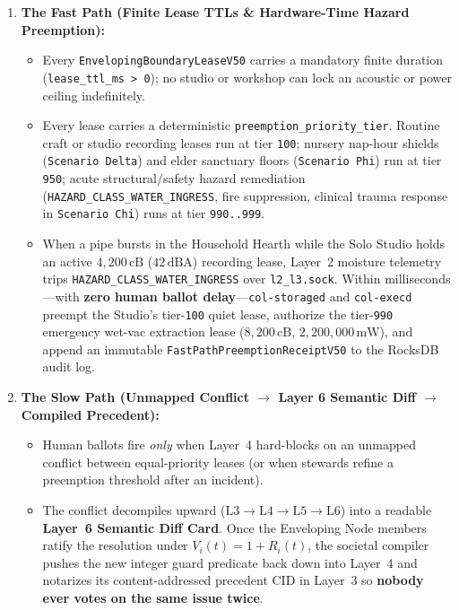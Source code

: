 \begin{enumerate}
    \item \textbf{The Fast Path (Finite Lease TTLs \& Hardware-Time Hazard Preemption):}
    \begin{itemize}
        \item Every \texttt{EnvelopingBoundaryLeaseV50} carries a mandatory finite duration (\texttt{lease\_ttl\_ms > 0}); no studio or workshop can lock an acoustic or power ceiling indefinitely.
        \item Every lease carries a deterministic \texttt{preemption\_priority\_tier}. Routine craft or studio recording leases run at tier \texttt{100}; nursery nap-hour shields (\texttt{Scenario Delta}) and elder sanctuary floors (\texttt{Scenario Phi}) run at tier \texttt{950}; acute structural/safety hazard remediation (\texttt{HAZARD\_CLASS\_WATER\_INGRESS}, fire suppression, clinical trauma response in \texttt{Scenario Chi}) runs at tier \texttt{990..999}.
        \item When a pipe bursts in the Household Hearth while the Solo Studio holds an active $4{,}200\,\mathrm{cB}$ ($42\,\mathrm{dBA}$) recording lease, Layer~2 moisture telemetry trips \texttt{HAZARD\_CLASS\_WATER\_INGRESS} over \texttt{l2\_l3.sock}. Within milliseconds---with \textbf{zero human ballot delay}---\texttt{col-storaged} and \texttt{col-execd} preempt the Studio's tier-\texttt{100} quiet lease, authorize the tier-\texttt{990} emergency wet-vac extraction lease ($8{,}200\,\mathrm{cB}$, $2{,}200{,}000\,\mathrm{mW}$), and append an immutable \texttt{FastPathPreemptionReceiptV50} to the RocksDB audit log.
    \end{itemize}
    \item \textbf{The Slow Path (Unmapped Conflict $\to$ Layer 6 Semantic Diff $\to$ Compiled Precedent):}
    \begin{itemize}
        \item Human ballots fire \textit{only} when Layer~4 hard-blocks on an unmapped conflict between equal-priority leases (or when stewards refine a preemption threshold after an incident).
        \item The conflict decompiles upward ($\mathrm{L3} \to \mathrm{L4} \to \mathrm{L5} \to \mathrm{L6}$) into a readable \textbf{Layer~6 Semantic Diff Card}. Once the Enveloping Node members ratify the resolution under $V_i(t) = 1 + R_i(t)$, the societal compiler pushes the new integer guard predicate back down into Layer~4 and notarizes its content-addressed precedent CID in Layer~3 so \textbf{nobody ever votes on the same issue twice}.
    \end{itemize}
\end{enumerate}

